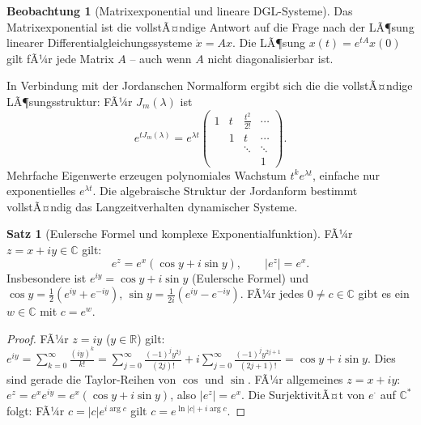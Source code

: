 ﻿\documentclass[a4paper,12pt]{report}
\theoremstyle{definition}
\newtheorem{satz}{Satz}
\newtheorem{beobachtung}{Beobachtung}
\begin{document}
\begin{beobachtung}[Matrixexponential und lineare DGL-Systeme]
    Das Matrixexponential ist die vollstÃ¤ndige Antwort auf die Frage nach
    der LÃ¶sung linearer Differentialgleichungssysteme $\dot{x} = Ax$.
    Die LÃ¶sung $x(t) = e^{tA} x(0)$ gilt fÃ¼r jede Matrix $A$ --
    auch wenn $A$ nicht diagonalisierbar ist.

    In Verbindung mit der Jordanschen Normalform ergibt sich die
    die vollstÃ¤ndige LÃ¶sungsstruktur: FÃ¼r $J_m(\lambda)$
    ist
    \[
        e^{tJ_m(\lambda)} = e^{\lambda t}
        \begin{pmatrix}
            1 & t & \frac{t^2}{2!} & \cdots \\
              & 1 & t & \cdots \\
              & & \ddots & \ddots \\
              & & & 1
        \end{pmatrix}.
    \]
    Mehrfache Eigenwerte erzeugen polynomiales Wachstum $t^k e^{\lambda t}$,
    einfache nur exponentielles $e^{\lambda t}$. Die algebraische Struktur
    der Jordanform bestimmt vollstÃ¤ndig das Langzeitverhalten dynamischer
    Systeme.
\end{beobachtung}

\begin{satz}[Eulersche Formel und komplexe Exponentialfunktion]
    FÃ¼r $z = x + iy \in \mathbb{C}$ gilt:
    \[
        e^z = e^x (\cos y + i \sin y), \qquad |e^z| = e^x.
    \]
    Insbesondere ist $e^{iy} = \cos y + i \sin y$ (Eulersche Formel) und
    $\cos y = \frac{1}{2}(e^{iy} + e^{-iy})$,
    $\sin y = \frac{1}{2i}(e^{iy} - e^{-iy})$.
    FÃ¼r jedes $0 \neq c \in \mathbb{C}$ gibt es ein $w \in \mathbb{C}$ mit
    $c = e^w$.
\end{satz}
\begin{proof}
    FÃ¼r $z = iy$ ($y \in \mathbb{R}$) gilt:
    $e^{iy} = \sum_{k=0}^\infty \frac{(iy)^k}{k!}
    = \sum_{j=0}^\infty \frac{(-1)^j y^{2j}}{(2j)!}
    + i \sum_{j=0}^\infty \frac{(-1)^j y^{2j+1}}{(2j+1)!}
    = \cos y + i \sin y$.
    Dies sind gerade die Taylor-Reihen von $\cos$ und $\sin$.
    FÃ¼r allgemeines $z = x + iy$: $e^z = e^x e^{iy} = e^x(\cos y + i \sin y)$,
    also $|e^z| = e^x$. Die SurjektivitÃ¤t von $e^{\cdot}$ auf $\mathbb{C}^*$
    folgt: FÃ¼r $c = |c| e^{i\arg c}$ gilt $c = e^{\ln|c| + i\arg c}$.
\end{proof}
\end{document}
